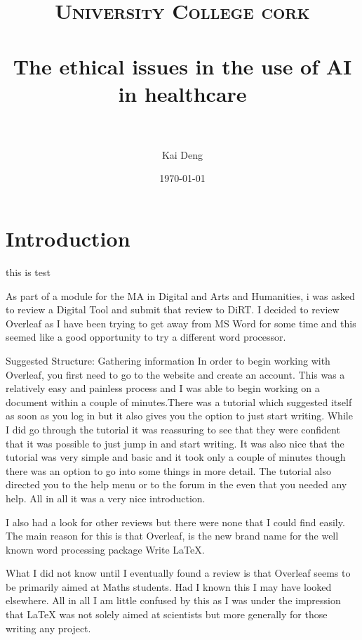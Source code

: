 \documentclass[paper=a4, fontsize=11pt]{scrartcl} %
\title{	
\normalfont \normalsize 
\textsc{University College cork} \\ [25pt] %
\horrule{0.5pt} \\[0.4cm] %
\huge The ethical issues in the use of AI in healthcare \\ %
\horrule{2pt} \\[0.5cm] %
}
\author{Kai Deng} %
\date{\normalsize\today} %
\numberwithin{equation}{section} %
\numberwithin{figure}{section} %
\numberwithin{table}{section} %
\begin{document}
\maketitle %


\section{Introduction}




this is test \cite{chenRethinkingAtrousConvolution2017}

As part of a module for the MA in Digital and Arts and Humanities, i was asked to review a Digital Tool and submit that review to DiRT. I decided to review Overleaf as I have been trying to get away from MS Word for some time and this seemed like a good opportunity to try a different word processor.



Suggested Structure:
Gathering information
In order to begin working with Overleaf, you first need to go to the website and create an account. This was a relatively easy and painless process and I was able to begin working on a document within a couple of minutes.There was a tutorial which suggested itself as soon as you log in but it also gives you the option to just start writing. While I did go through the tutorial it was reassuring to see that they were confident that it was possible to just jump in and start writing. It was also nice that the tutorial was very simple and basic and it took only a couple of minutes though there was an option to go into some things in more detail. The tutorial also directed you to the help menu or to the forum in the even that you needed any help. All in all it was a very nice introduction.


I also had a look for other reviews but there were none that I could find easily. The main reason for this is that Overleaf, is the new brand name for the well known word processing package Write LaTeX.

What I did not know until I eventually found a review is that Overleaf seems to be primarily aimed at Maths students. Had I known this I may have looked elsewhere. All in all I am little confused by this as I was under the impression that LaTeX was not solely aimed at scientists but more generally for those writing any project.
\end{document}
